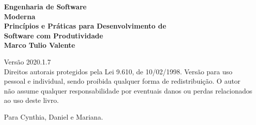 \documentclass[
  11pt,
  twoside]{book}
\author{}
\date{}
\begin{document}
\frontmatter

\thispagestyle{empty}



\newpage
\thispagestyle{empty}
\vspace*{4cm}
\begin{center}
{\Huge \bf  Engenharia de Software\\[.3cm] Moderna}\\ 
\vspace*{1cm}
{\Large \bf  Princípios e Práticas para Desenvolvimento de\\[.3cm] Software com Produtividade}\\ 
\vspace*{3cm}
{\Large \bf Marco Tulio Valente}
\end{center}
\newpage

\newpage
\thispagestyle{empty}
\vspace*{3cm}
\begin{center}
{\Large  Versão 2020.1.7}\\ 
\vspace*{1cm}
{Direitos autorais protegidos pela Lei 9.610, de 10/02/1998. Versão para  uso pessoal e individual, sendo proibida qualquer forma de redistribuição. O autor não assume qualquer responsabilidade por eventuais danos ou perdas relacionados ao uso deste livro.}
\end{center}

\vspace*{3cm}




\newpage
\newpage

\thispagestyle{empty}
\vspace*{5cm}
\begin{center}
\large Para Cynthia, Daniel e Mariana.
\end{center}

\newpage
\newpage

\tableofcontents
\end{document}
